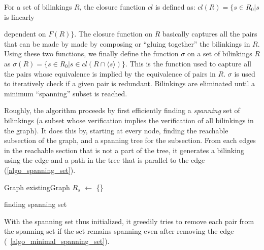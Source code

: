 \documentclass[sigplan,review,anonymous]{acmart}
\begin{document}
For a set of bilinkings $R$, the closure function $cl$ is defined as:
$cl(R) = \{ s\in R_0| s$ is linearly {dependent on $F(R) \}$.
%
The closure function on $R$ basically captures all the pairs that can be made by made by composing or ``gluing together'' the bilinkings in $R$. 
%
Using these two functions, we finally define the function $\sigma$ on a set of bilinkings $R$ as
$\sigma(R) = \{s \in R_0 | s\in cl(R\cap \langle s \rangle) \}$.
This is the function used to capture all the pairs whose equivalence is implied by the equivalence of pairs in $R$.
%
$\sigma$ is used  to iteratively check if a given pair is redundant.
Bilinkings are eliminated until a minimum ``spanning'' subset is reached.

Roughly, the algorithm proceeds by first efficiently finding a \textit{spanning} set of bilinkings (a subset whose verification implies the verification of all bilinkings in the graph).
It does this by, starting at every node, finding the reachable subsection of the graph, and a spanning tree for the subsection.
From each edges in the reachable section that is not a part of the tree, it generates a bilinking using the edge and a path in the tree that is parallel to the edge (\ref{algo_spanning_set}).

\begin{algorithm}
\label{alg_spanning_set}
\DontPrintSemicolon
{}

Graph existingGraph\;
$R_s$ $\gets$ \{\}\;
\;

\caption{finding spanning set}\label{algo_spanning_set}
\end{algorithm}

With the spanning set thus initialized, it greedily tries to remove each pair from the spanning set if the set remains spanning even after removing the edge (~\ref{algo_minimal_spanning_set}).

\begin{algorithm}
\DontPrintSemicolon
{}



\end{algorithm}}
\end{document}
